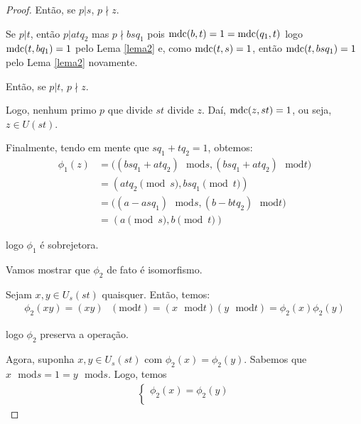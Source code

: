 \begin{proof}
		\par\vspace{0.3cm} Então, se $p|s$, $p\nmid z$. 
		\par\vspace{0.3cm} Se $p|t$, então $p|atq_2$ mas $p\nmid bsq_1$ pois $\operatorname{mdc}(b,t) = 1 = \operatorname{mdc}(q_1,t)$ logo $\operatorname{mdc}(t,bq_1) = 1$ pelo Lema \eqref{lema2} e, como $\operatorname{mdc}(t,s) = 1$, então $\operatorname{mdc}(t,bsq_1) = 1$ pelo Lema \eqref{lema2} novamente.
		\par\vspace{0.3cm} Então, se $p|t$, $p\nmid z$. 
		\par\vspace{0.3cm} Logo, nenhum primo $p$ que divide $st$ divide $z$. Daí, $\operatorname{mdc}(z,st) = 1$, ou seja, $z\in U(st)$.
		\par\vspace{0.3cm} Finalmente, tendo em mente que $sq_1 + tq_2 = 1$, obtemos:
		\begin{align*}
		\phi_1(z) &= \Big((bsq_1 + atq_2)\text{ }\mathrm{mod} s , (bsq_1 + atq_2)\text{ }\mathrm{mod} t\Big) \\ &= ( atq_2\pmod s, bsq_1\pmod t) \\ &= \Big((a - asq_1)\text{ }\mathrm{mod} s , (b - btq_2)\text{ }\mathrm{mod} t \Big) \\ &= (a\pmod s, b\pmod t)
		\end{align*}
		\par\vspace{0.3cm}logo $\phi_1$ é sobrejetora.
		\vspace{0.3cm}\par Vamos mostrar que $\phi_2$ de fato é isomorfismo.
		\par\vspace{0.3cm} Sejam $x, y\in U_s(st)$ quaisquer. Então, temos:
		\begin{align*}
		\phi_2(xy) = (xy)\text{ }(\mathrm{mod} t) = (x\text{ }\mathrm{mod} t)(y\text{ }\mathrm{mod} t) = \phi_2(x)\phi_2(y)
		\end{align*}
		\par\vspace{0.3cm}logo $\phi_2$ preserva a operação.
		\par\vspace{0.3cm} Agora, suponha $x,y\in U_s(st)$ com $\phi_2(x) = \phi_2(y)$. Sabemos que $x\text{ }\mathrm{mod} s = 1 = y\text{ }\mathrm{mod} s$. Logo, temos
		\begin{align*}
		\begin{cases}
		\phi_2(x) = \phi_2(y) \\

\end{cases}
\end{align*}
\end{proof}
